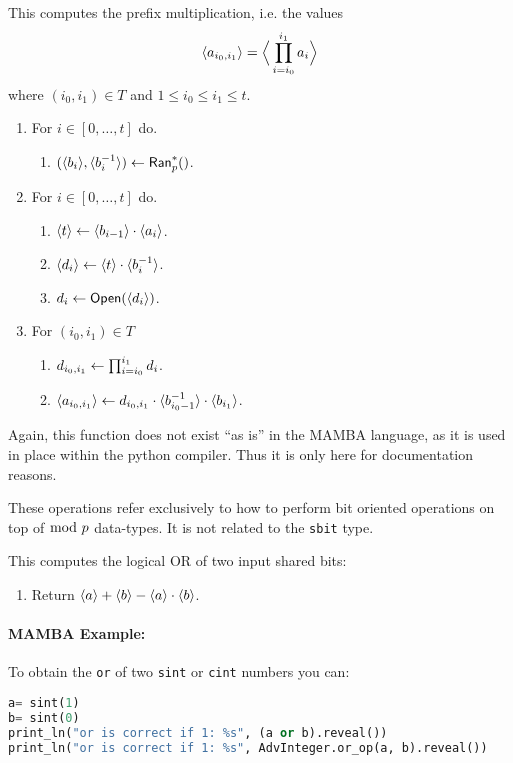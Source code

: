 This computes the prefix multiplication, i.e. the values
\[ \langle a_{i_0,i_1} \rangle = \Big\langle \prod_{i=i_0}^{i_1} a_i \Big\rangle \]
where $(i_0,i_1) \in T$ and $1 \le i_0 \le i_1 \le t$.
\begin{enumerate}
  \item For $i \in [0,\ldots,t]$ do.
        \begin{enumerate}
          \item $(\langle b_i \rangle,\langle b_i^{-1} \rangle) \leftarrow \mathsf{Ran}_p^*()$.
        \end{enumerate}
  \item For $i \in [0,\ldots,t]$ do.
        \begin{enumerate}
          \item $\langle t \rangle \leftarrow \langle b_{i-1} \rangle \cdot \langle a_i \rangle$.
          \item $\langle d_i \rangle \leftarrow \langle t \rangle \cdot \langle b_i^{-1} \rangle$.
          \item $d_i \leftarrow {\mathsf{Open}}(\langle d_i \rangle)$.
        \end{enumerate}
  \item For $(i_0,i_1) \in T$
        \begin{enumerate}
          \item $d_{i_0,i_1} \leftarrow \prod_{i=i_0}^{i_1} d_i$.
          \item $\langle a_{i_0,i_1} \rangle \leftarrow d_{i_0,i_1} \cdot
                  \langle b_{i_0-1}^{-1} \rangle \cdot \langle b_{i_1} \rangle$.
        \end{enumerate}
\end{enumerate}
Again, this function does not exist ``as is'' in the MAMBA language, as it
is used in place within the python compiler. Thus it is only here
for documentation reasons.



These operations refer exclusively to how to perform bit oriented operations on top of
$\bmod \; p$ data-types. It is not related to the \verb|sbit| type.

This computes the logical OR of two input shared bits:
\begin{enumerate}
  \item Return $\langle a \rangle+\langle b \rangle-\langle a \rangle \cdot \langle b \rangle$.
\end{enumerate}
\paragraph{MAMBA Example:} To obtain the \verb|or| of two \verb|sint| or \verb|cint| numbers you can:
\begin{lstlisting}[language={python}]
a= sint(1)
b= sint(0)
print_ln("or is correct if 1: %s", (a or b).reveal())
print_ln("or is correct if 1: %s", AdvInteger.or_op(a, b).reveal())
\end{lstlisting}

